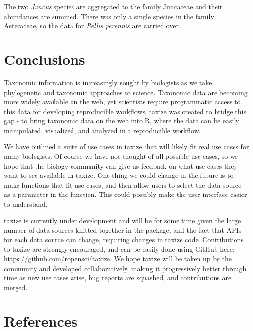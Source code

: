 \begin{sloppypar}
The two \emph{Juncus} species are aggregated to the family Juncaceae and their abundances are summed. 
There was only a single species in the family Asteraceae, so the data for \emph{Bellis perennis} are carried over.


\section{Conclusions}
\label{sec:taxize:conclusions}
Taxonomic information is increasingly sought by biologists as we take phylogenetic and taxonomic approaches to science.
Taxonomic data are becoming more widely available on the web, yet scientists require programmatic access to this data for developing reproducible workflows.
taxize was created to bridge this gap - to bring taxonomic data on the web into R, where the data can be easily manipulated, visualized, and analyzed in a reproducible workflow.

We have outlined a suite of use cases in taxize that will likely fit real use cases for many biologists.
Of course we have not thought of all possible use cases, so we hope that the biology community can give us feedback on what use cases they want to see available in taxize.
One thing we could change in the future is to make functions that fit use cases, and then allow users to select the data source as a parameter in the function.
This could possibly make the user interface easier to understand.

taxize is currently under development and will be for some time given the large number of data sources knitted together in the package, and the fact that APIs for each data source can change, requiring changes in taxize code.
Contributions to taxize are strongly encouraged, and can be easily done using GitHub here: \url{https://github.com/ropensci/taxize}.
We hope taxize will be taken up by the community and developed collaboratively, making it progressively better through time as new use cases arise, bug reports are squashed, and contributions are merged.

\newpage
\section{References}
\printbibliography[heading=none,sorting=nyt]

\end{sloppypar}
